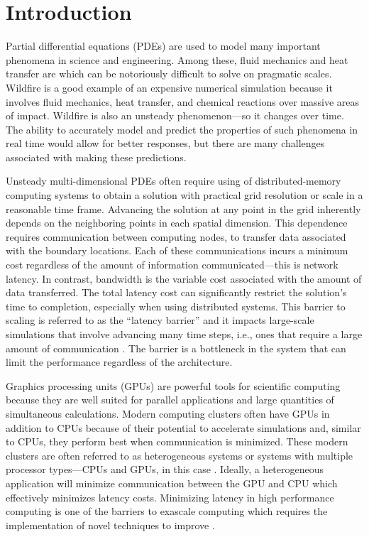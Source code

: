 \documentclass[preprints,article,accept,moreauthors,pdftex]{Definitions/mdpi}
\begin{document}
\section{Introduction}
Partial differential equations (PDEs) are used to model many important phenomena in science and engineering. Among these, fluid mechanics and heat transfer are which can be notoriously difficult to solve on pragmatic scales. Wildfire is a good example of an expensive numerical simulation because it involves fluid mechanics, heat transfer, and chemical reactions over massive areas of impact. Wildfire is also an unsteady phenomenon---so it changes over time. The ability to accurately model and predict the properties of such phenomena in real time would allow for better responses, but there are many challenges associated with making these predictions.

Unsteady multi-dimensional PDEs often require using of distributed-memory computing systems to obtain a solution with practical grid resolution or scale in a reasonable time frame. Advancing the solution at any point in the grid inherently depends on the neighboring points in each spatial dimension. This dependence requires communication between computing nodes, to transfer data associated with the boundary locations. Each of these communications incurs a minimum cost regardless of the amount of information communicated---this is network latency. In contrast, bandwidth is the variable cost associated with the amount of data transferred. The total latency cost can significantly restrict the solution's time to completion, especially when using distributed systems. This barrier to scaling is referred to as the ``latency barrier'' and it impacts large-scale simulations that involve advancing many time steps, i.e., ones that require a large amount of communication \cite{Alhubail2016ThePDEs}. 
The barrier is a bottleneck in the system that can limit the performance regardless of the architecture.

Graphics processing units (GPUs) are powerful tools for scientific computing because they are well suited for parallel applications and large quantities of simultaneous calculations. Modern computing clusters often have GPUs in addition to CPUs because of their potential to accelerate simulations and, similar to CPUs, they perform best when communication is minimized. These modern clusters are often referred to as heterogeneous systems or systems with multiple processor types---CPUs and GPUs, in this case \cite{owens2007survey,owens2008gpu}. Ideally, a heterogeneous application will minimize communication between the GPU and CPU which effectively minimizes latency costs. Minimizing latency in high performance computing is one of the barriers to exascale computing which requires the implementation of novel techniques to improve \cite{Alexandrov2016RouteSkills}.
\end{document}
